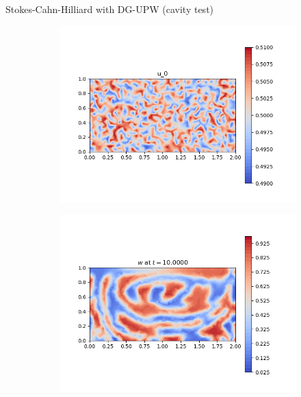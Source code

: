 \begin{frame}{Stokes-Cahn-Hilliard with DG-UPW {\small(cavity test)}}
	\vspace{-0.3cm}
	\begin{figure}[t]
		\begin{subfigure}{0.49\textwidth}
			\centering
			\includegraphics[scale=0.28]{img/stokes-cahn-hilliard/u_stokes_initial_condition.png}
		\end{subfigure}
		\hspace*{-1.5cm}
		\begin{subfigure}{0.49\textwidth}
			\centering
			\includegraphics[scale=0.28]{img/stokes-cahn-hilliard/w_DG-UPW+Eyre_stokes_nt-40000_t-10.00000_P0.png}
		\end{subfigure}

\end{figure}
\end{frame}

